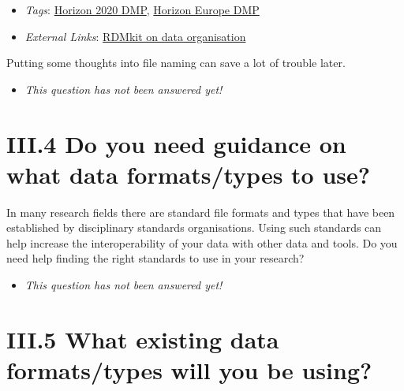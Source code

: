 \documentclass[a4paper,12pt]{report}
\begin{document}
\begin{itemize}
  \item \textit{Tags}: \ul{Horizon 2020 DMP}, \ul{Horizon Europe DMP}
  
  \item \textit{External Links}: \href{https://rdmkit.elixir-europe.org/data_organisation.html}{RDMkit on data organisation}\end{itemize}


\noindent
\begin{markdown}
Putting some thoughts into file naming can save a lot of trouble later. 
\end{markdown}



\begin{itemize}
  \item[\XSolidBrush] \textit{This question has not been answered yet!}
\end{itemize}
  


\section*{\protect\textcolor{colorSecId}{III.4} Do you need guidance on what data formats/types to use?}

\label{b1df3c74-0b1f-4574-81c4-4cc2d780c1af.d4a879f1-0bad-4d6e-8ecc-07ae28e0848b}




\noindent
\begin{markdown}
In many research fields there are standard file formats and types that have been established by disciplinary standards organisations. Using such standards can help increase the interoperability of your data with other data and tools. Do you need help finding the right standards to use in your research?
\end{markdown}



\begin{itemize}
  \item[\XSolidBrush] \textit{This question has not been answered yet!}
\end{itemize}
  


\section*{\protect\textcolor{colorSecId}{III.5} What existing data formats/types will you be using?}
\end{document}
